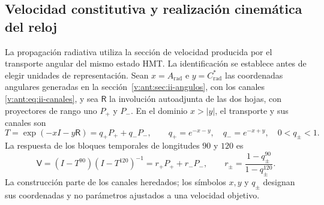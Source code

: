 \subsection{Velocidad constitutiva y realización cinemática del reloj}
\label{v:sec:enlace-velocidad-constitutiva}

La propagación radiativa utiliza la sección de velocidad producida por el
transporte angular del mismo estado HMT. La identificación se establece
antes de elegir unidades de representación. Sean $x=A_{\mathrm{rad}}$ e
$y=C^*_{\mathrm{rad}}$ las coordenadas angulares generadas en la
sección~\ref{v:ant:sec:ii-angulos}, con los canales
\eqref{v:ant:eq:ii-canales}, y sea
$\mathsf R$ la involución autoadjunta de las dos hojas, con proyectores
de rango uno $P_+$ y $P_-$. En el dominio $x>|y|$, el transporte y sus
canales son
\begin{equation}
 T=\exp(-xI-y\mathsf R)=q_+P_++q_-P_-,
 \qquad q_+=e^{-x-y},\quad q_-=e^{-x+y},\quad 0<q_\pm<1.
 \label{v:eq:velocidad-transporte}
\end{equation}
La respuesta de los bloques temporales de longitudes $90$ y $120$ es
\begin{equation}
 \mathsf V=(I-T^{90})(I-T^{120})^{-1}
       =r_+P_++r_-P_-,\qquad
 r_\pm=\frac{1-q_\pm^{90}}{1-q_\pm^{120}}.
 \label{v:eq:velocidad-respuesta}
\end{equation}
La construcción parte de los canales heredados; los símbolos $x,y$ y
$q_\pm$ designan sus coordenadas y no parámetros ajustados a una velocidad
objetivo.

